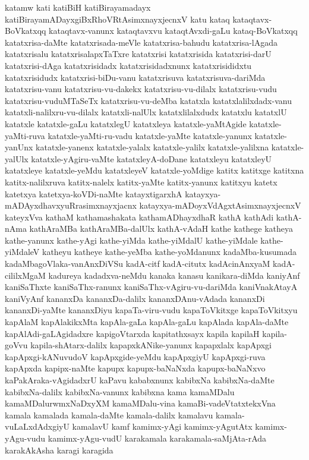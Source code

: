 {katamw
kati
katiBiH
katiBirayamadayx
katiBirayamADayxgiBxRhoVRtAsimxnayxjecnxV
katu
kataq
kataqtavx-BoVkatxqq
kataqtavx-vanunx
kataqtavxvu
kataqtAvxdi-gaLu
kataq-BoVkatxqq
katatxrisa-daMte
katatxrisada-meVle
katatxrisa-bahudu
katatxrisa-lAgada
katatxrisalu
katatxrisalapxTaTxre
katatxrisi
katatxrisida
katatxrisi-darU
katatxrisi-dAga
katatxrisidadx
katatxrisidadxnunx
katatxrisididxtu
katatxrisidudx
katatxrisi-biDu-vanu
katatxrisuva
katatxrisuva-dariMda
katatxrisu-vanu
katatxrisu-vu-dakekx
katatxrisu-vu-dilalx
katatxrisu-vudu
katatxrisu-vuduMTaSeTx
katatxrisu-vu-deMba
katatxla
katatxlalilxdadx-vanu
katatxli-nalilxru-vu-dilalx
katatxli-nalUlx
katatxlilalxdudx
katatxlu
katatxlU
katatxle
katatxle-gaLu
katatxlegU
katatxleya
katatxle-yaMtAgide
katatxle-yaMti-ruva
katatxle-yaMti-ru-vadu
katatxle-yaMte
katatxle-yanunx
katatxle-yanUnx
katatxle-yanenx
katatxle-yalalx
katatxle-yalilx
katatxle-yalilxna
katatxle-yalUlx
katatxle-yAgiru-vaMte
katatxleyA-doDane
katatxleyu
katatxleyU
katatxleye
katatxle-yeMdu
katatxleyeV
katatxle-yoMdige
katitx
katitxge
katitxna
katitx-nalilxruva
katitx-nalelx
katitx-yaMte
katitx-yanunx
katitxyu
katetx
katetxya
katetxya-koVDi-naMte
katayxtigarxhA
katayxya-mADAyxdhavxyuRrasimxnayxjacnx
katayxya-mADoyxVdAgxtAsimxnayxjecnxV
kateyxVva
kathaM
kathamashakata
kathamADhayxdhaR
kathA
kathAdi
kathA-nAma
kathAraMBa
kathAraMBa-dalUlx
kathA-vAdaH
kathe
kathege
katheya
kathe-yanunx
kathe-yAgi
kathe-yiMda
kathe-yiMdalU
kathe-yiMdale
kathe-yiMdaleV
katheyu
katheye
kathe-yeMba
kathe-yoMdanunx
kadaMba-kusumada
kadaMbagoVlaka-vanAnxDiVSu
kadA-citf
kadA-citutx
kadAcinAnxyaM
kadA-cililxMgaM
kadureya
kadadxva-neMdu
kanaka
kanasu
kanikara-diMda
kaniyAnf
kaniSaThxte
kaniSaThx-ranunx
kaniSaThx-vAgiru-vu-dariMda
kaniVnakAtayA
kaniVyAnf
kananxDa
kananxDa-dalilx
kananxDAnu-vAdada
kananxDi
kananxDi-yaMte
kananxDiyu
kapaTa-viru-vudu
kapaToVkitxge
kapaToVkitxyu
kapAlaM
kapAlakikxMta
kapAla-gaLa
kapAla-gaLu
kapAlada
kapAla-daMte
kapAlAdi-gaLAgidadxre
kapigoVtarxda
kapitathxsayx
kapila
kapilaH
kapila-goVvu
kapila-shAtarx-dalilx
kapapxkANike-yanunx
kapapxlalx
kapApxgi
kapApxgi-kANuvudoV
kapApxgide-yeMdu
kapApxgiyU
kapApxgi-ruva
kapApxda
kapipx-naMte
kapupx
kapupx-baNaNxda
kapupx-baNaNxvo
kaPakAraka-vAgidadxrU
kaPavu
kababxnunx
kabibxNa
kabibxNa-daMte
kabibxNa-dalilx
kabibxNa-vanunx
kabibxna
kama
kamaMDalu
kamaMDalurwmxNaDxyXM
kamaMDalu-vina
kamaBi-vadeVtatxtekxVna
kamala
kamalada
kamala-daMte
kamala-dalilx
kamalavu
kamala-vuLaLxdAdxgiyU
kamalavU
kamf
kamimx-yAgi
kamimx-yAgutAtx
kamimx-yAgu-vudu
kamimx-yAgu-vudU
karakamala
karakamala-saMjAta-rAda
karakAkAsha
karagi
karagida
}
